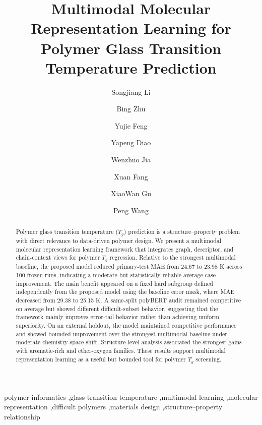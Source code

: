 \documentclass[review,12pt]{elsarticle}
\def\corref#1{}
\begin{document}
\begin{frontmatter}

\title{Multimodal Molecular Representation Learning for Polymer Glass Transition Temperature Prediction}

\author[inst1]{Songjiang Li}
\author[inst1]{Bing Zhu}
\author[inst1]{Yujie Feng}
\author[inst2]{Yapeng Diao}
\author[inst1]{Wenzhuo Jia}
\author[inst3]{Xuan Fang}
\author[inst1]{XiaoWan Gu}
\author[inst1]{Peng Wang\corref{cor1}}

\address[inst1]{School of Computer Science and Technology, Changchun University of Science and Technology, Changchun 130022, China}
\address[inst2]{School of Materials Science and Engineering, Changchun University of Science and Technology, Changchun 130022, China}
\address[inst3]{State Key Laboratory of High Power Semiconductor Lasers, School of Physics, Changchun University of Science and Technology, Changchun 130022, China}

\begin{abstract}
Polymer glass transition temperature ($T_g$) prediction is a structure--property problem with direct relevance to data-driven polymer design. We present a multimodal molecular representation learning framework that integrates graph, descriptor, and chain-context views for polymer $T_g$ regression. Relative to the strongest multimodal baseline, the proposed model reduced primary-test MAE from 24.67 to 23.98 K across 100 frozen runs, indicating a moderate but statistically reliable average-case improvement. The main benefit appeared on a fixed hard subgroup defined independently from the proposed model using the baseline error mask, where MAE decreased from 29.38 to 25.15 K. A same-split polyBERT audit remained competitive on average but showed different difficult-subset behavior, suggesting that the framework mainly improves error-tail behavior rather than achieving uniform superiority. On an external holdout, the model maintained competitive performance and showed bounded improvement over the strongest multimodal baseline under moderate chemistry-space shift. Structure-level analysis associated the strongest gains with aromatic-rich and ether-oxygen families. These results support multimodal representation learning as a useful but bounded tool for polymer $T_g$ screening.
\end{abstract}

\begin{keyword}
polymer informatics \sep glass transition temperature \sep multimodal learning \sep molecular representation \sep difficult polymers \sep materials design \sep structure--property relationship
\end{keyword}

\end{frontmatter}
\end{document}
